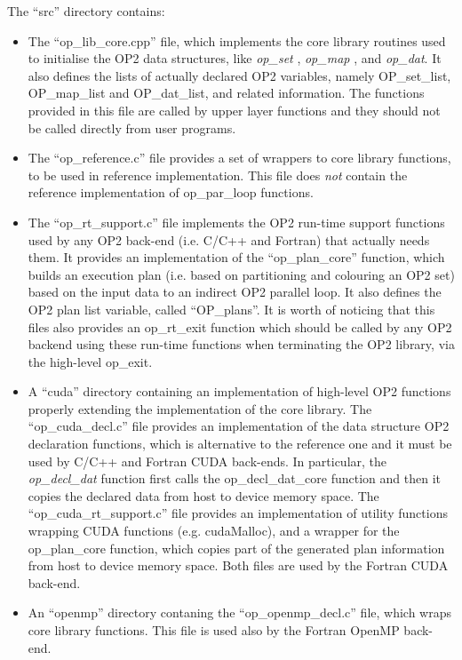 \documentclass[a4paper]{article}
\newcommand{\opset}{{\em op\_set }}
\newcommand{\opmap}{{\em op\_map }}
\newcommand{\opdatN}{{\em op\_dat}} %
\newcommand{\opdecldat}{{\em op\_decl\_dat }}
\newcommand{\oploop}{op\_par\_loop }
\begin{document}
The ``src'' directory contains:

\begin{itemize}

\item The ``op\_lib\_core.cpp'' file, which implements the core library
  routines used to initialise the OP2 data structures, like \opset,
  \opmap, and \opdatN. It also defines the lists of actually declared
  OP2 variables, namely OP\_set\_list, OP\_map\_list and OP\_dat\_list,
  and related information. The functions provided in this file are
  called by upper layer functions and they should not be called
  directly from user programs.

\item The ``op\_reference.c'' file provides a set of wrappers to core
  library functions, to be used in reference implementation. This file
  does {\it not} contain the reference implementation of \oploop
  functions.

\item The ``op\_rt\_support.c'' file implements the OP2 run-time support
  functions used by any OP2 back-end (i.e. C/C++ and Fortran) that
  actually needs them. It provides an implementation of the
  ``op\_plan\_core'' function, which builds an execution plan (i.e.
  based on partitioning and colouring an OP2 set) based on the input
  data to an indirect OP2 parallel loop. It also defines the OP2 plan
  list variable, called ``OP\_plans''. It is worth of noticing that
  this files also provides an op\_rt\_exit function which should be
  called by any OP2 backend using these run-time functions when
  terminating the OP2 library, via the high-level op\_exit.

\item A ``cuda'' directory containing an implementation of high-level
  OP2 functions properly extending the implementation of the core
  library. The ``op\_cuda\_decl.c'' file provides an implementation of
  the data structure OP2 declaration functions, which is alternative
  to the reference one and it must be used by C/C++ and Fortran CUDA
  back-ends. In particular, the \opdecldat function first calls the
  op\_decl\_dat\_core function and then it copies the declared data
  from host to device memory space. The ``op\_cuda\_rt\_support.c'' file
  provides an implementation of utility functions wrapping CUDA
  functions (e.g. cudaMalloc), and a wrapper for the op\_plan\_core
  function, which copies part of the generated plan information from
  host to device memory space. Both files are used by the Fortran CUDA
  back-end.

\item An ``openmp'' directory contaning the
  ``op\_openmp\_decl.c'' file, which wraps core library functions.
  This file is used also by the Fortran OpenMP back-end.

\end{itemize}
\end{document}
